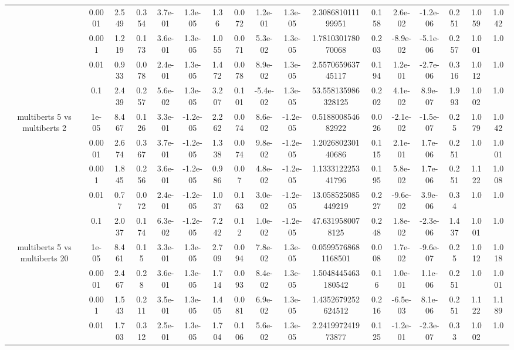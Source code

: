 \begin{tabular}{|c|c|c|c|c|c|c|c|c|c|c|c|c|c|c|c|c|}
 & 0.0001 & 2.549 & 0.354 & 3.7e-01 & 1.3e-05 & 1.36 & 0.072 & 1.2e-01 & 1.3e-05 & 2.308681011199951 & 0.158 & 2.6e-02 & -1.2e-06 & 0.251 & 1.059 & 1.042 \\
 & 0.001 & 1.219 & 0.173 & 3.6e-01 & 1.3e-05 & 1.055 & 0.071 & 5.3e-02 & 1.3e-05 & 1.781030178070068 & 0.203 & -8.9e-02 & -5.1e-06 & 0.257 & 1.001 & 1.0 \\
 & 0.01 & 0.933 & 0.078 & 2.4e-01 & 1.3e-05 & 1.472 & 0.078 & 8.9e-02 & 1.3e-05 & 2.557065963745117 & 0.194 & 1.2e-01 & -2.7e-06 & 0.316 & 1.012 & 1.0 \\
 & 0.1 & 2.439 & 0.257 & 5.6e-02 & 1.3e-05 & 3.207 & 0.101 & -5.4e-02 & 1.3e-05 & 53.558135986328125 & 0.202 & 4.1e-02 & 8.9e-07 & 1.993 & 1.002 & 1.0 \\
\hline
\multirow{5}{*}{multiberts 5 vs multiberts 2} & 1e-05 & 8.467 & 0.126 & 3.3e-01 & -1.2e-05 & 2.262 & 0.074 & 8.6e-02 & -1.2e-05 & 0.518800854682922 & 0.026 & -2.1e-02 & -1.5e-07 & 0.25 & 1.079 & 1.042 \\
 & 0.0001 & 2.674 & 0.367 & 3.7e-01 & -1.2e-05 & 1.338 & 0.074 & 9.8e-02 & -1.2e-05 & 1.202680230140686 & 0.115 & 2.1e-01 & 1.7e-06 & 0.251 & 1.0 & 1.001 \\
 & 0.001 & 1.845 & 0.256 & 3.6e-01 & -1.2e-05 & 0.986 & 0.07 & 4.8e-02 & -1.2e-05 & 1.133312225341796 & 0.195 & 5.8e-02 & 1.7e-06 & 0.251 & 1.122 & 1.008 \\
 & 0.01 & 0.77 & 0.072 & 2.4e-01 & -1.2e-05 & 1.037 & 0.163 & 3.0e-02 & -1.2e-05 & 13.058525085449219 & 0.227 & -9.6e-02 & 3.9e-06 & 0.34 & 1.0 & 1.0 \\
 & 0.1 & 2.037 & 0.174 & 6.3e-02 & -1.2e-05 & 7.242 & 0.12 & 1.0e-02 & -1.2e-05 & 47.6319580078125 & 0.248 & 1.8e-02 & -2.3e-06 & 1.437 & 1.001 & 1.0 \\
\hline
\multirow{5}{*}{multiberts 5 vs multiberts 20} & 1e-05 & 8.461 & 0.15 & 3.3e-01 & 1.3e-05 & 2.709 & 0.094 & 7.8e-02 & 1.3e-05 & 0.05995768681168501 & 0.008 & 1.7e-02 & -9.6e-07 & 0.25 & 1.012 & 1.018 \\
 & 0.0001 & 2.467 & 0.28 & 3.6e-01 & 1.3e-05 & 1.714 & 0.093 & 8.4e-02 & 1.3e-05 & 1.5048445463180542 & 0.16 & 1.0e-01 & 1.1e-06 & 0.251 & 1.0 & 1.001 \\
 & 0.001 & 1.543 & 0.211 & 3.5e-01 & 1.3e-05 & 1.405 & 0.081 & 6.9e-02 & 1.3e-05 & 1.4352679252624512 & 0.216 & -6.5e-03 & 8.1e-06 & 0.251 & 1.122 & 1.189 \\
 & 0.01 & 1.703 & 0.312 & 2.5e-01 & 1.3e-05 & 1.704 & 0.106 & 5.6e-02 & 1.3e-05 & 2.241997241973877 & 0.125 & -1.2e-01 & -2.3e-07 & 0.33 & 1.002 & 1.0 \\

\end{tabular}

